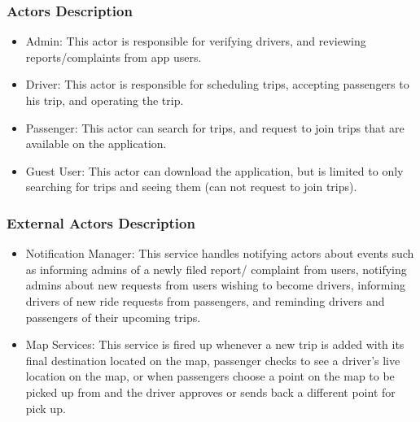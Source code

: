 \documentclass[a4paper, 12pt]{report} %
\begin{document}
        \subsubsection{Actors Description}
            \begin{itemize}
                \item Admin: This actor is responsible for verifying drivers, and reviewing reports/complaints from app users.
                \item Driver: This actor is responsible for scheduling trips, accepting passengers to his trip, and operating the trip.
                \item Passenger: This actor can search for trips, and request to join trips that are available on the application.
                \item Guest User: This actor can download the application, but is limited to only searching for trips and seeing them (can not request to join trips).
            \end{itemize}
        \subsubsection{External Actors Description}
            \begin{itemize}
                \item Notification Manager: This service handles notifying actors about events such as informing admins of a newly filed report/ complaint from users, notifying admins about new requests from users wishing to become drivers, informing drivers of new ride requests from passengers, and reminding drivers and passengers of their upcoming trips.
                \item Map Services: This service is fired up whenever a new trip is added with its final destination located on the map, passenger checks to see a driver’s live location on the map, or when passengers choose a point on the map to be picked up from and the driver approves or sends back a different point for pick up.
            \end{itemize}
\end{document}
